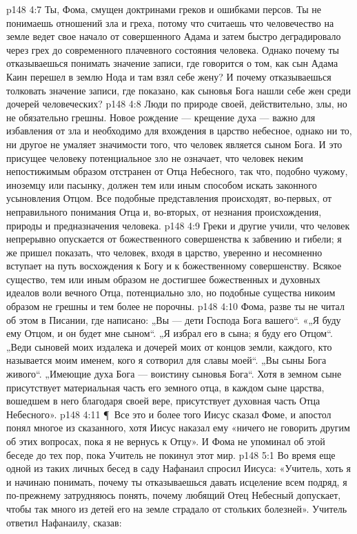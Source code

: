 \vs p148 4:7 Ты, Фома, смущен доктринами греков и ошибками персов. Ты не понимаешь отношений зла и греха, потому что считаешь что человечество на земле ведет свое начало от совершенного Адама и затем быстро деградировало через грех до современного плачевного состояния человека. Однако почему ты отказываешься понимать значение записи, где говорится о том, как сын Адама Каин перешел в землю Нода и там взял себе жену? И почему отказываешься толковать значение записи, где показано, как сыновья Бога нашли себе жен среди дочерей человеческих?
\vs p148 4:8 Люди по природе своей, действительно, злы, но не обязательно грешны. Новое рождение --- крещение духа --- важно для избавления от зла и необходимо для вхождения в царство небесное, однако ни то, ни другое не умаляет значимости того, что человек является сыном Бога. И это присущее человеку потенциальное зло не означает, что человек неким непостижимым образом отстранен от Отца Небесного, так что, подобно чужому, иноземцу или пасынку, должен тем или иным способом искать законного усыновления Отцом. Все подобные представления происходят, во\hyp{}первых, от неправильного понимания Отца и, во\hyp{}вторых, от незнания происхождения, природы и предназначения человека.
\vs p148 4:9 Греки и другие учили, что человек непрерывно опускается от божественного совершенства к забвению и гибели; я же пришел показать, что человек, входя в царство, уверенно и несомненно вступает на путь восхождения к Богу и к божественному совершенству. Всякое существо, тем или иным образом не достигшее божественных и духовных идеалов воли вечного Отца, потенциально зло, но подобные существа никоим образом не грешны и тем более не порочны.
\vs p148 4:10 Фома, разве ты не читал об этом в Писании, где написано: „Вы --- дети Господа Бога вашего“. «„Я буду ему Отцом, и он будет мне сыном“. „Я избрал его в сына; я буду его Отцом“. „Веди сыновей моих издалека и дочерей моих от концов земли, каждого, кто называется моим именем, кого я сотворил для славы моей“. „Вы сыны Бога живого“. „Имеющие духа Бога --- воистину сыновья Бога“. Хотя в земном сыне присутствует материальная часть его земного отца, в каждом сыне царства, вошедшем в него благодаря своей вере, присутствует духовная часть Отца Небесного».
\vs p148 4:11 \P\ Все это и более того Иисус сказал Фоме, и апостол понял многое из сказанного, хотя Иисус наказал ему «ничего не говорить другим об этих вопросах, пока я не вернусь к Отцу». И Фома не упоминал об этой беседе до тех пор, пока Учитель не покинул этот мир.
\vs p148 5:1 Во время еще одной из таких личных бесед в саду Нафанаил спросил Иисуса: «Учитель, хоть я и начинаю понимать, почему ты отказываешься давать исцеление всем подряд, я по\hyp{}прежнему затрудняюсь понять, почему любящий Отец Небесный допускает, чтобы так много из детей его на земле страдало от стольких болезней». Учитель ответил Нафанаилу, сказав:
